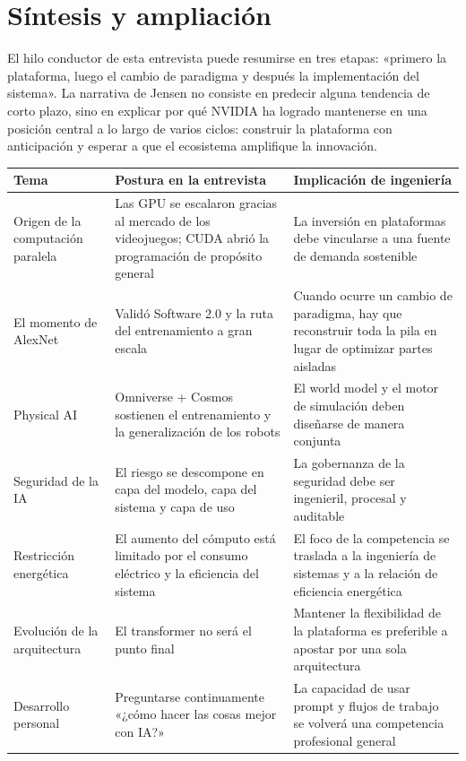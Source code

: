 \section{Síntesis y ampliación}

El hilo conductor de esta entrevista puede resumirse en tres etapas: «primero la plataforma, luego el cambio de paradigma y después la implementación del sistema». La narrativa de Jensen no consiste en predecir alguna tendencia de corto plazo, sino en explicar por qué NVIDIA ha logrado mantenerse en una posición central a lo largo de varios ciclos: construir la plataforma con anticipación y esperar a que el ecosistema amplifique la innovación.

\begin{longtable}{p{} p{} p{}}
\toprule
\textbf{Tema} & \textbf{Postura en la entrevista} & \textbf{Implicación de ingeniería} \\
\midrule
Origen de la computación paralela & Las GPU se escalaron gracias al mercado de los videojuegos; CUDA abrió la programación de propósito general & La inversión en plataformas debe vincularse a una fuente de demanda sostenible \\
\midrule
El momento de AlexNet & Validó Software 2.0 y la ruta del entrenamiento a gran escala & Cuando ocurre un cambio de paradigma, hay que reconstruir toda la pila en lugar de optimizar partes aisladas \\
\midrule
Physical AI & Omniverse + Cosmos sostienen el entrenamiento y la generalización de los robots & El world model y el motor de simulación deben diseñarse de manera conjunta \\
\midrule
Seguridad de la IA & El riesgo se descompone en capa del modelo, capa del sistema y capa de uso & La gobernanza de la seguridad debe ser ingenieril, procesal y auditable \\
\midrule
Restricción energética & El aumento del cómputo está limitado por el consumo eléctrico y la eficiencia del sistema & El foco de la competencia se traslada a la ingeniería de sistemas y a la relación de eficiencia energética \\
\midrule
Evolución de la arquitectura & El transformer no será el punto final & Mantener la flexibilidad de la plataforma es preferible a apostar por una sola arquitectura \\
\midrule
Desarrollo personal & Preguntarse continuamente «¿cómo hacer las cosas mejor con IA?» & La capacidad de usar prompt y flujos de trabajo se volverá una competencia profesional general \\
\bottomrule
\end{longtable}

